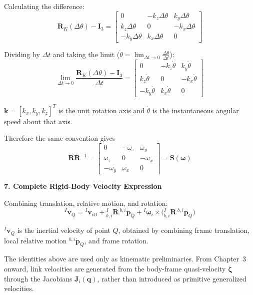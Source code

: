 \documentclass[12pt,a4paper]{report}
\newcommand{\newsymbols}[1]{\par\noindent{}#1\par\vspace{0.35em}}
\newcommand{\vect}[1]{\mathbf{#1}}
\newcommand{\mat}[1]{\mathbf{#1}}
\newcommand{\Rot}[2]{{}_{#1}^{#2}\mathbf{R}}
\newcommand{\angvel}{\boldsymbol{\omega}}
\begin{document}
Calculating the difference:
\begin{equation}
\mat{R}_{K}(\Delta\theta) - \mat{I}_{3}
=
\begin{bmatrix}
0 & -k_{z}\Delta\theta & k_{y}\Delta\theta \\
k_{z}\Delta\theta & 0 & -k_{x}\Delta\theta \\
-k_{y}\Delta\theta & k_{x}\Delta\theta & 0
\end{bmatrix}
\end{equation}

Dividing by $\Delta t$ and taking the limit ($\dot{\theta} = \lim_{\Delta t \to 0} \frac{\Delta\theta}{\Delta t}$):
\begin{equation}
\lim_{\Delta t \to 0}
\frac{\mat{R}_{K}(\Delta\theta) - \mat{I}_{3}}{\Delta t}
=
\begin{bmatrix}
0 & -k_{z}\dot{\theta} & k_{y}\dot{\theta} \\
k_{z}\dot{\theta} & 0 & -k_{x}\dot{\theta} \\
-k_{y}\dot{\theta} & k_{x}\dot{\theta} & 0
\end{bmatrix}
\end{equation}
\newsymbols{$\vect{k} = [k_x,k_y,k_z]^T$ is the unit rotation axis and $\dot{\theta}$ is the instantaneous angular speed about that axis.}

Therefore the same convention gives
\begin{equation}
\dot{\mat{R}}\mat{R}^{-1}
=
\begin{bmatrix}
0 & -\omega_{z} & \omega_{y} \\
\omega_{z} & 0 & -\omega_{x} \\
-\omega_{y} & \omega_{x} & 0
\end{bmatrix}
=
\mat{S}(\angvel)
\end{equation}

\textbf{7. Complete Rigid-Body Velocity Expression}

Combining translation, relative motion, and rotation:
\begin{equation}
{}^{I}\vect{v}_{Q}
=
{}^{I}\vect{v}_{iO}
+
\Rot{b,i}{I}\,{}^{b,i}\dot{\vect{p}}_{Q}
+
{}^{I}\angvel_{i} \times \bigl(\Rot{b,i}{I}\,{}^{b,i}\vect{p}_{Q}\bigr)
\end{equation}
\newsymbols{${}^{I}\vect{v}_{Q}$ is the inertial velocity of point $Q$, obtained by combining frame translation, local relative motion ${}^{b,i}\dot{\vect{p}}_{Q}$, and frame rotation.}

The identities above are used only as kinematic preliminaries. From Chapter~3 onward, link velocities are generated from the body-frame quasi-velocity $\boldsymbol{\zeta}$ through the Jacobians $\mathbf{J}_i(\mathbf{q})$, rather than introduced as primitive generalized velocities.
\end{document}
